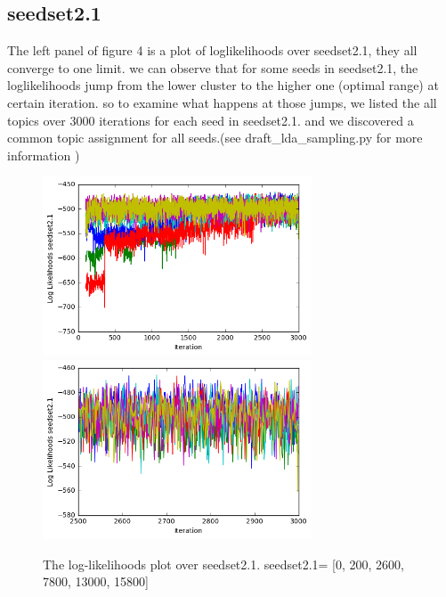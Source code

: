 \documentclass[11pt]{article}
\begin{document}
\begin{spacing}{1.6}
\subsection{seedset2.1}
\noindent The left panel of figure 4 is a plot of loglikelihoods over seedset2.1, they all converge to one limit. we can observe that for some seeds in seedset2.1, the loglikelihoods jump from the lower cluster to the higher one (optimal range) at certain iteration. so to examine what happens at those jumps, we listed the all topics over 3000 iterations for each seed in seedset2.1. and we discovered a common topic assignment for all seeds.(see draft_lda_sampling.py for more information ) \\
\begin{minipage}{1.0\textwidth}
\begin{figure}[H]
\includegraphics[width = 80mm]{figure5.png}
\includegraphics[width = 80mm]{figure6.png}
\caption{The log-likelihoods plot over seedset2.1.  seedset2.1= [0, 200, 2600, 7800, 13000, 15800]}\scriptsize
\end{figure}
\end{minipage}\\


\end{spacing}
\end{document}
